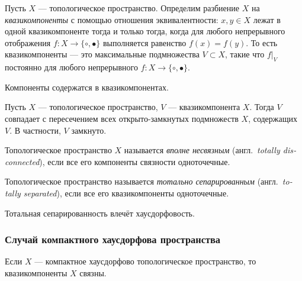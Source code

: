 \documentclass[
	extrafontsizes,
	11pt,
	hyphens,
]{memoir}
\begin{document}
\begin{definition}
Пусть $X$ --- топологическое пространство. Определим разбиение $X$ на \emph{квазикомпоненты} с помощью отношения эквивалентности: $x,y \in X$ лежат в одной квазикомпоненте тогда и только тогда, когда для любого непрерывного отображения $f: X \to \{\circ,\bullet\}$ выполняется равенство $f(x) = f(y)$. То есть квазикомпоненты --- это максимальные подмножества $V \subset X$, такие что $f|_V$ постоянно для любого непрерывного $f: X \to \{\circ,\bullet\}$.
\end{definition}

\begin{remark}
Компоненты содержатся в квазикомпонентах.
\end{remark}

\begin{remark}
Пусть \(X\) --- топологическое пространство, $V$ --- квазикомпонента \(X\). Тогда $V$ совпадает с пересечением всех от\-кры\-то-зам\-кну\-тых подмножеств $X$, содержащих $V$. В частности, $V$ замкнуто.
\end{remark}

\begin{definition}
Топологическое пространство $X$ называется \emph{вполне несвязным} (англ.\ \textenglish{\emph{totally disconnected}}), если все его компоненты связности одноточечные. 
\end{definition}

\begin{definition}
Топологическое пространство называется \emph{тотально сепарированным} (англ.\ \textenglish{\emph{totally separated}}), если все его квазикомпоненты одноточечные. 
\end{definition}

\begin{remark}
Тотальная сепарированность влечёт хаусдорфовость.
\end{remark}

\subsubsection{Случай компактного хаусдорфова пространства}

\begin{theorem}
Если $X$ --- компактное хаусдорфово топологическое пространство, то квазикомпоненты $X$ связны.
\end{theorem}
\end{document}
